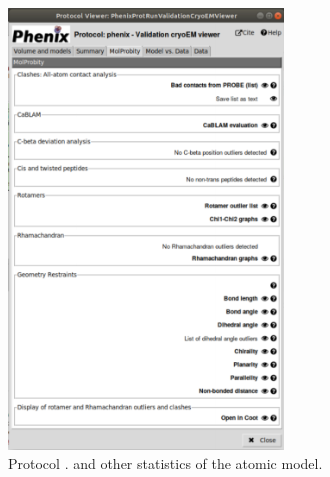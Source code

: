 \begin{itemize}
\begin{itemize}
\begin{figure}[H]
         \includegraphics[width=0.65\textwidth]{Images_appendix/Fig202.pdf}
         \caption{Protocol . \molprobity and other statistics of the atomic model.}
         \label{fig:validationCryoEM_protocol_4}
        \end{figure}
        

\end{itemize}
\end{itemize}

